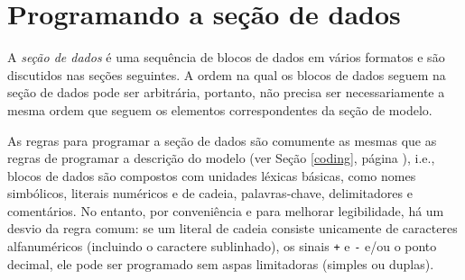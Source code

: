 \documentclass[11pt, brazil]{report}
\begin{document}
%
%
%


\section{Programando a seção de dados}

A {\it seção de dados} é uma sequência de blocos de dados em vários formatos
e são discutidos nas seções seguintes. A ordem na qual os blocos de dados
seguem na seção de dados pode ser arbitrária, portanto, não precisa ser
necessariamente a mesma ordem que seguem os elementos correspondentes
da seção de modelo.

As regras para programar a seção de dados são comumente as mesmas que as regras
de \linebreak programar a descrição do modelo (ver Seção \ref{coding}, página
\pageref{coding}), i.e., blocos de dados são compostos com unidades léxicas
básicas, como nomes simbólicos, literais numéricos e de cadeia,
palavras-chave, \linebreak delimitadores e comentários. No entanto, por conveniência
e para melhorar legibilidade, há um desvio da regra comum: se um literal
de cadeia consiste unicamente de caracteres alfanuméricos (incluindo
o caractere sublinhado), os sinais {\tt+} e {\tt-} e/ou o ponto decimal,
ele pode ser programado sem aspas limitadoras (simples ou duplas).
\end{document}
